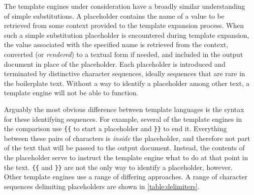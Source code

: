 The \gls{template engine}s under consideration have a broadly similar understanding of simple substitutions. A placeholder contains the name of a value to be retrieved from some context provided to the template expansion process. When such a simple substitution placeholder is encountered during template expansion, the value associated with the specified name is retrieved from the context, converted (or \emph{rendered}) to a textual form if needed, and included in the output document in place of the placeholder. Each placeholder is introduced and terminated by distinctive character sequences, ideally sequences that are rare in the boilerplate text. Without a way to identify a placeholder among other text, a \gls{template engine} will not be able to function.

Arguably the most obvious difference between \gls{template language}s is the syntax for these identifying sequences. For example, several of the \gls{template engine}s in the comparison use \verb!{{! to start a placeholder and \verb!}}! to end it. Everything between these pairs of characters is \emph{inside} the placeholder, and therefore not part of the text that will be passed to the output document. Instead, the contents of the placeholder serve to instruct the \gls{template engine} what to do at that point in the text. \verb!{{! and \verb!}}! are not the only way to identify a placeholder, however. Other \gls{template engine}s use a range of differing approaches. A range of character sequences delimiting placeholders are shown in \autoref{table:delimiters}.

